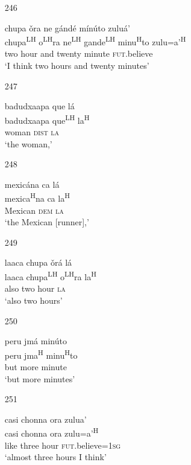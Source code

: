 \begin{itemize}
\item[246]
 
\glll   chupa \v{o}ra ne g\'{a}nd\'{e} m\'{i}n\'{u}to zulu\'{a}'\\
chupa\textsuperscript{LH} o\textsuperscript{LH}ra ne\textsuperscript{LH} gande\textsuperscript{LH} minu\textsuperscript{H}to zulu=a'\textsuperscript{H}\\
 two hour and twenty minute \textsc{fut}.believe\\
\glt `I think two hours and twenty minutes'
 


\item[247]
 
\glll   badudxaapa que l\'{a}\\
badudxaapa que\textsuperscript{LH} la\textsuperscript{H}\\
woman \textsc{dist} \textsc{la}\\
\glt `the woman,'
 


\item[248]
 
\glll   mexic\'{a}na ca l\'{a}\\
mexica\textsuperscript{H}na ca la\textsuperscript{H} \\
Mexican \textsc{dem} \textsc{la}\\
\glt `the Mexican [runner],' 
 


\item[249]
 
\glll   laaca chupa \v{o}r\'{a} l\'{a}\\
 laaca chupa\textsuperscript{LH} o\textsuperscript{LH}ra la\textsuperscript{H}\\
 also two hour \textsc{la}\\
\glt `also two hours'
 


\item[250]
 
\glll  peru jm\'{a} min\'{u}to\\
peru jma\textsuperscript{H} minu\textsuperscript{H}to\\
but more minute\\
\glt `but more minutes'
 


\item[251]
 
\glll  casi chonna ora zulua'\\
casi chonna ora zulu=a'\textsuperscript{H}\\
like three hour \textsc{fut}.believe=\textsc{1sg}\\
\glt `almost three hours I think'
 




\end{itemize}
